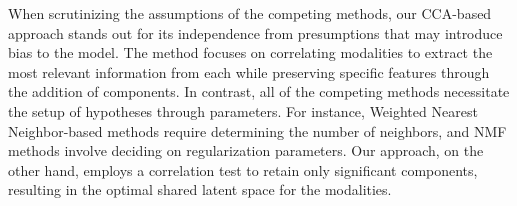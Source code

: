 When scrutinizing the assumptions of the competing methods, our CCA-based approach stands out for its independence from presumptions that may introduce bias to the model. The method focuses on correlating modalities to extract the most relevant information from each while preserving specific features through the addition of components. In contrast, all of the competing methods necessitate the setup of hypotheses through parameters. For instance, Weighted Nearest Neighbor-based methods require determining the number of neighbors, and NMF methods involve deciding on regularization parameters. Our approach, on the other hand, employs a correlation test to retain only significant components, resulting in the optimal shared latent space for the modalities.


